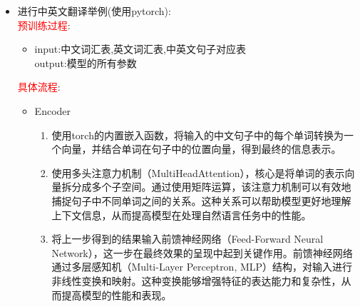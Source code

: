 \documentclass[t]{beamer}
\begin{document}
\begin{CJK*}{UTF8}{gkai}
\begin{frame}	
	\begin{itemize}
		\item
		进行中英文翻译举例(使用pytorch):\\
		\textcolor{red}{预训练过程}:
		\begin{itemize}
			\item input:中文词汇表,英文词汇表,中英文句子对应表\\
				output:模型的所有参数
		\end{itemize}
		\textcolor{red}{具体流程}:
		\begin{itemize}
			\item Encoder
			\begin{enumerate}
				\item 使用torch的内置嵌入函数，将输入的中文句子中的每个单词转换为一个向量，并结合单词在句子中的位置向量，得到最终的信息表示。
				\item 使用多头注意力机制（MultiHeadAttention），核心是将单词的表示向量拆分成多个子空间。通过使用矩阵运算，该注意力机制可以有效地捕捉句子中不同单词之间的关系。这种关系可以帮助模型更好地理解上下文信息，从而提高模型在处理自然语言任务中的性能。
				\item 将上一步得到的结果输入前馈神经网络（Feed-Forward Neural Network），这一步在最终效果的呈现中起到关键作用。前馈神经网络通过多层感知机（Multi-Layer Perceptron, MLP）结构，对输入进行非线性变换和映射。这种变换能够增强特征的表达能力和复杂性，从而提高模型的性能和表现。
			\end{enumerate}
		\end{itemize}
	\end{itemize}
\end{frame}


\end{CJK*}
\end{document}
